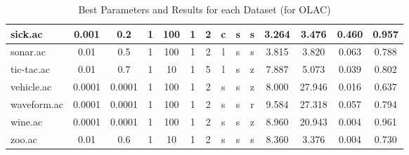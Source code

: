 \begin{table}[htbp]
\begin{tabular}{|l|c|c|c|c|c|c|c|c|c||c|c|c|c|}
		\hline
		sick.ac        & 0.001    & 0.2         & 1              & 100                 & 1             & 2             & c      & s        & s        & 3.264          & 3.476          & 0.460          & 0.957          \\
		\hline
		sonar.ac       & 0.01     & 0.5         & 1              & 100                 & 1             & 2             & l      & s        & s        & 3.815          & 3.820          & 0.063          & 0.788          \\
		\hline
		tic-tac.ac     & 0.01     & 0.7         & 1              & 10                  & 1             & 5             & l      & s        & z        & 7.887          & 5.073          & 0.039          & 0.802          \\
		\hline
		vehicle.ac     & 0.0001   & 0.0001      & 1              & 100                 & 1             & 2             & s      & s        & z        & 8.000          & 27.946         & 0.016          & 0.637          \\
		\hline
		waveform.ac    & 0.0001   & 0.0001      & 1              & 100                 & 1             & 2             & s      & s        & r        & 9.584          & 27.318         & 0.057          & 0.794          \\
		\hline
		wine.ac        & 0.0001   & 0.0001      & 1              & 100                 & 1             & 2             & s      & s        & z        & 8.960          & 20.943         & 0.004          & 0.961          \\
		\hline
		zoo.ac         & 0.01     & 0.6         & 1              & 10                  & 1             & 2             & s      & s        & s        & 8.360          & 3.376          & 0.004          & 0.730          \\
		\hline
		\end{tabular}
	\caption{Best Parameters and Results for each Dataset (for OLAC)}
	\label{tab:best_runs_for_each_db_olac}
\end{table}